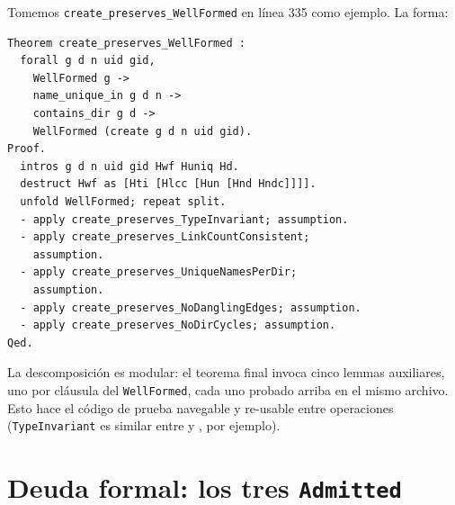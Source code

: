 Tomemos \texttt{create\_preserves\_WellFormed} en 
línea 335 como ejemplo. La forma:

\begin{lstlisting}[language=coq]
Theorem create_preserves_WellFormed :
  forall g d n uid gid,
    WellFormed g ->
    name_unique_in g d n ->
    contains_dir g d ->
    WellFormed (create g d n uid gid).
Proof.
  intros g d n uid gid Hwf Huniq Hd.
  destruct Hwf as [Hti [Hlcc [Hun [Hnd Hndc]]]].
  unfold WellFormed; repeat split.
  - apply create_preserves_TypeInvariant; assumption.
  - apply create_preserves_LinkCountConsistent;
    assumption.
  - apply create_preserves_UniqueNamesPerDir;
    assumption.
  - apply create_preserves_NoDanglingEdges; assumption.
  - apply create_preserves_NoDirCycles; assumption.
Qed.
\end{lstlisting}

La descomposición es modular: el teorema final invoca cinco lemmas
auxiliares, uno por cláusula del \texttt{WellFormed}, cada uno probado
arriba en el mismo archivo. Esto hace el código de prueba navegable y
re-usable entre operaciones (\texttt{TypeInvariant} es similar entre
\opcreate{} y \oplink, por ejemplo).

\section{Deuda formal: los tres \texttt{Admitted}}

